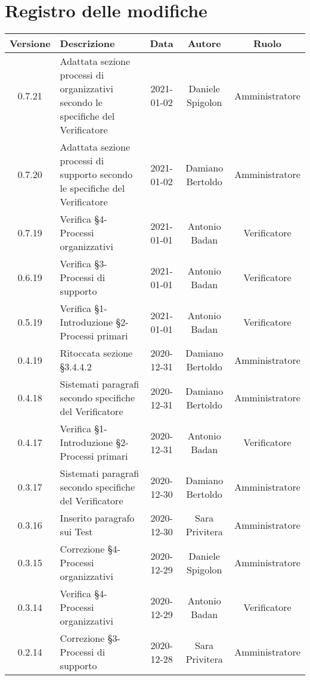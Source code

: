 \section*{Registro delle modifiche}

\begin{center}
	\begin{longtable}{|c|p{5cm}|c|c|c|}
	\hline
	\rowcolor{lighter-grayer}
	\textbf{Versione} & \textbf{Descrizione} & \textbf{Data} & \textbf{Autore} & \textbf{Ruolo} \\
	\hline
	\endfirsthead

	0.7.21 & Adattata sezione processi di organizzativi secondo le specifiche del Verificatore & 2021-01-02 & Daniele Spigolon & Amministratore \\
	\hline
	0.7.20 & Adattata sezione processi di supporto secondo le specifiche del Verificatore & 2021-01-02 & Damiano Bertoldo & Amministratore \\
	\hline
	0.7.19 & Verifica §4-Processi organizzativi & 2021-01-01 & Antonio Badan & Verificatore \\
	\hline
	0.6.19 & Verifica §3-Processi di supporto & 2021-01-01 & Antonio Badan & Verificatore \\
	\hline
	0.5.19 & Verifica §1-Introduzione §2-Processi primari & 2021-01-01 & Antonio Badan & Verificatore \\
	\hline
	0.4.19 & Ritoccata sezione §3.4.4.2 & 2020-12-31 & Damiano Bertoldo & Amministratore \\
	\hline
	0.4.18 & Sistemati paragrafi secondo specifiche del Verificatore & 2020-12-31 & Damiano Bertoldo & Amministratore \\
	\hline
	0.4.17 & Verifica §1-Introduzione §2-Processi primari & 2020-12-31 & Antonio Badan & Verificatore \\
	\hline
	0.3.17 & Sistemati paragrafi secondo specifiche del Verificatore  & 2020-12-30 & Damiano Bertoldo & Amministratore \\
	\hline
	0.3.16 & Inserito paragrafo sui Test  & 2020-12-30 & Sara Privitera & Amministratore \\
	\hline
	0.3.15 & Correzione §4-Processi organizzativi  & 2020-12-29 & Daniele Spigolon & Amministratore \\
	\hline
	0.3.14 & Verifica §4-Processi organizzativi  & 2020-12-29 & Antonio Badan & Verificatore \\
	\hline
	0.2.14 & Correzione §3-Processi di supporto  & 2020-12-28 & Sara Privitera & Amministratore \\

\end{longtable}
\end{center}
